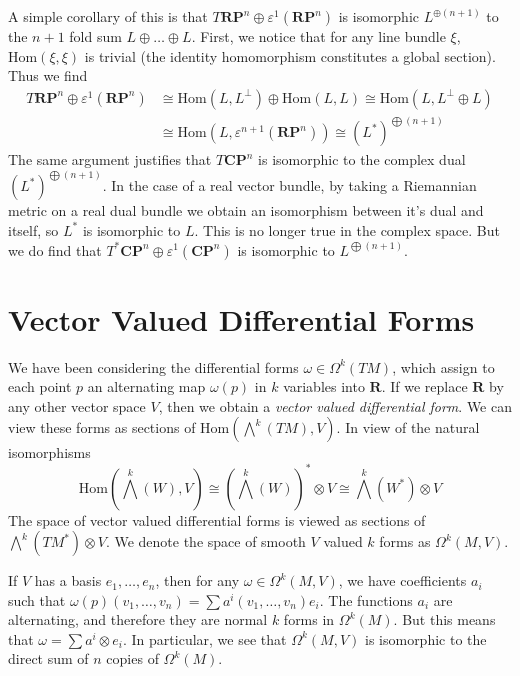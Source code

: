 A simple corollary of this is that $T\mathbf{RP}^n \oplus \varepsilon^1(\mathbf{RP}^n)$ is isomorphic $L^{\oplus (n+1)}$ to the $n+1$ fold sum $L \oplus \dots \oplus L$. First, we notice that for any line bundle $\xi$, $\text{Hom}(\xi,\xi)$ is trivial (the identity homomorphism constitutes a global section). Thus we find
%
\begin{align*}
    T\mathbf{RP}^n \oplus \varepsilon^1(\mathbf{RP}^n) &\cong \text{Hom}(L,L^\perp) \oplus \text{Hom}(L,L) \cong \text{Hom}(L,L^\perp \oplus L)\\
    &\cong \text{Hom}(L,\varepsilon^{n+1}(\mathbf{RP}^n)) \cong (L^*)^{\bigoplus (n+1)}
\end{align*}
%
The same argument justifies that $T\mathbf{CP}^n$ is isomorphic to the complex dual $(L^*)^{\bigoplus (n+1)}$. In the case of a real vector bundle, by taking a Riemannian metric on a real dual bundle we obtain an isomorphism between it's dual and itself, so $L^*$ is isomorphic to $L$. This is no longer true in the complex space. But we do find that $T^* \mathbf{CP}^n \oplus \varepsilon^1(\mathbf{CP}^n)$ is isomorphic to $L^{\bigoplus (n+1)}$.

\section{Vector Valued Differential Forms}

We have been considering the differential forms $\omega \in \Omega^k(TM)$, which assign to each point $p$ an alternating map $\omega(p)$ in $k$ variables into $\mathbf{R}$. If we replace $\mathbf{R}$ by any other vector space $V$, then we obtain a \emph{vector valued differential form}. We can view these forms as sections of $\text{Hom} \left( \bigwedge^k(TM) ,V \right)$. In view of the natural isomorphisms
%
\[ \text{Hom} \left( \bigwedge^k(W) ,V \right) \cong (\bigwedge^k(W))^* \otimes V \cong \bigwedge^k(W^*) \otimes V \]
%
The space of vector valued differential forms is viewed as sections of $\bigwedge^k(TM^*) \otimes V$. We denote the space of smooth $V$ valued $k$ forms as $\Omega^k(M,V)$.

If $V$ has a basis $e_1, \dots, e_n$, then for any $\omega \in \Omega^k(M,V)$, we have coefficients $a_i$ such that $\omega(p)(v_1, \dots, v_n) = \sum a^i(v_1, \dots, v_n) e_i$. The functions $a_i$ are alternating, and therefore they are normal $k$ forms in $\Omega^k(M)$. But this means that $\omega = \sum a^i \otimes e_i$. In particular, we see that $\Omega^k(M,V)$ is isomorphic to the direct sum of $n$ copies of $\Omega^k(M)$.


